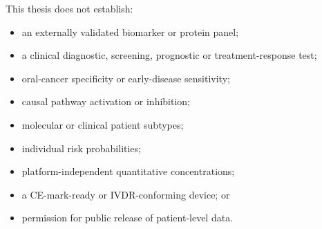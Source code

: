 This thesis does not establish:

\begin{itemize}
\item an externally validated biomarker or protein panel;
\item a clinical diagnostic, screening, prognostic or treatment-response test;
\item oral-cancer specificity or early-disease sensitivity;
\item causal pathway activation or inhibition;
\item molecular or clinical patient subtypes;
\item individual risk probabilities;
\item platform-independent quantitative concentrations;
\item a CE-mark-ready or IVDR-conforming device; or
\item permission for public release of patient-level data.
\end{itemize}
